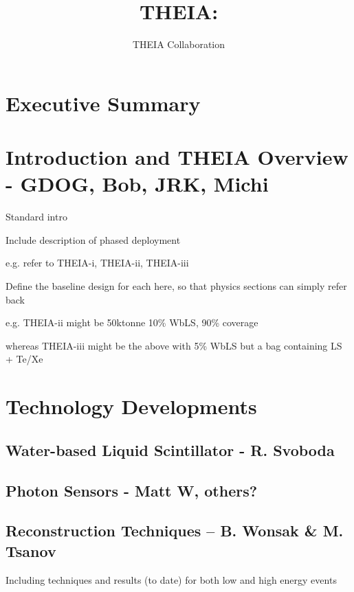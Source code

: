 \documentclass[11pt,prd,letterpaper,amsmath,amssymb,final,nofootinbib
,unsortedaddress,superscriptaddress
]{revtex4-1}
\begin{document}
\title{ THEIA: \\ {\small }}

\author{THEIA Collaboration}

\maketitle

\section*{Executive Summary}

\newpage

\tableofcontents
\setcounter{tocdepth}{5}
\newpage

\section{Introduction and THEIA Overview - GDOG, Bob, JRK, Michi}

Standard intro

Include description of phased deployment

e.g. refer to THEIA-i, THEIA-ii, THEIA-iii

Define the baseline design for each here, so that physics sections can simply refer back

e.g. THEIA-ii might be 50ktonne 10\% WbLS, 90\% coverage

whereas THEIA-iii might be the above with 5\% WbLS but a bag containing LS + Te/Xe

\section{Technology Developments}
\subsection{Water-based Liquid Scintillator - R. Svoboda}
\subsection{Photon Sensors - Matt W, others?}
\subsection{Reconstruction Techniques -- B. Wonsak \& M. Tsanov}

Including techniques and results (to date) for both low and high energy events
\end{document}
